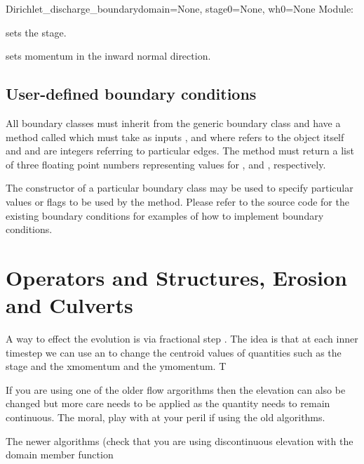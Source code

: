 \documentclass{manual}
\begin{document}
\begin{classdesc}{Dirichlet_discharge_boundary}{domain=None, stage0=None, wh0=None}
Module: 

 sets the stage.

 sets momentum in the inward normal direction.
\end{classdesc}

\section{User-defined boundary conditions}
\label{sec:roll your own}

All boundary classes must inherit from the generic boundary class
 and have a method called  which must
take as inputs ,  and  where  refers to the
object itself and  and  are integers referring to
particular edges. The method must return a list of three floating point
numbers representing values for ,
 and , respectively.

The constructor of a particular boundary class may be used to specify
particular values or flags to be used by the  method.
Please refer to the source code for the existing boundary conditions
for examples of how to implement boundary conditions.


\chapter{Operators and Structures, Erosion and Culverts}
\label{sec:operators}

A way to effect the evolution is via fractional step .  The idea is that at each inner timestep we can use
an  to change the centroid values of quantities such as the stage and the xmomentum and the ymomentum. T

If you are using one of the older flow argorithms then the elevation can also be changed but more care needs to be applied as the  quantity needs to remain continuous.
The moral, play with  at your peril if using the old algorithms.

The newer algorithms (check that you are using discontinuous elevation with the domain member function 
\end{document}

